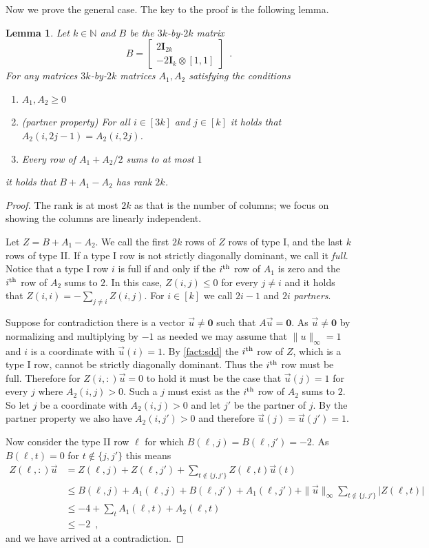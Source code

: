 \documentclass[10pt,a4paper]{article}
\newcommand{\N}{\mathbb{N}}
\newcommand{\zero}{\mathbf{0}}
\newcommand{\Id}{\mathbf{I}}
\newcommand{\vecu}{\vec{u}}
\newcommand{\ith}{i^{\scriptsize \mbox{{\rm th}}}}
\newcommand{\1}{\mathbf{1}}
\newtheorem{lemma}[theorem]{Lemma}
\theoremstyle{definition}
\begin{document}
Now we prove the general case.  The key to the proof is the following lemma.
\begin{lemma}
\label{lem:2k}
Let $k \in \N$ and $B$ be the $3k$-by-$2k$ matrix
\[
B = \begin{bmatrix} 2 \Id_{2k} \\ -2 \Id_k \otimes [1,1] \end{bmatrix} \enspace .
\]
For any matrices $3k$-by-$2k$ matrices $A_1, A_2$ satisfying the conditions
\begin{enumerate}
\item $A_1, A_2 \ge 0$
\item (partner property) For all $i \in [3k]$ and $j \in [k]$ it holds that $A_2(i,2j-1) = A_2(i,2j)$.
\item Every row of $A_1 + A_2/2$ sums to at most $1$
\end{enumerate}
it holds that $B +A_1 - A_2$ has rank $2k$.
\end{lemma}

\begin{proof}
The rank is at most $2k$ as that is the number of columns;  we focus on showing the columns are
linearly independent.

Let $Z = B + A_1 -A_2$.  We call the first $2k$ rows of $Z$ rows of type I, and the last $k$ rows
of type II.  If a type I row is not strictly diagonally dominant, we call it \emph{full}.  Notice that
a type I row $i$ is full if and only if the $\ith$ row of $A_1$ is zero and the $\ith$ row of $A_2$ sums to $2$.  In this
case, $Z(i,j) \le 0$ for every $j \ne i$ and it holds that $Z(i,i) = -\sum_{j \ne i} Z(i,j)$.
%
For $i \in [k]$ we call $2i-1$ and $2i$ \emph{partners}.

Suppose for contradiction there is a vector $\vecu \ne \zero$ such that $A\vecu = \zero$.  As $\vecu \ne \zero$ by
normalizing and multiplying by $-1$ as needed we may assume that $\|u\|_\infty = 1$ and $i$ is a coordinate with $\vecu(i)=1$.
By \cref{fact:sdd} the $\ith$ row of $Z$, which is a type I row, cannot be strictly diagonally dominant.  Thus the $\ith$ row
must be full.  Therefore for $Z(i,:) \vecu = 0$ to hold it must be the case that $\vecu(j) = 1$ for every $j$ where $A_2(i,j) > 0$.
Such a $j$ must exist as the $\ith$ row of $A_2$ sums to $2$.  So let $j$ be a coordinate with $A_2(i,j) > 0$ and let $j'$ be
the partner of $j$.  By the partner property we also have $A_2(i,j') > 0$ and therefore $\vecu(j) = \vecu(j') = 1$.

Now consider the type II row $\ell$ for which $B(\ell,j) = B(\ell,j') = -2$.
As $B(\ell,t) = 0$ for $t \not \in \{j,j'\}$ this means
\begin{align*}
Z(\ell,:) \vecu &= Z(\ell,j) + Z(\ell, j') + \sum_{t \not \in \{j,j'\}} Z(\ell,t) \vecu(t) \\
& \le B(\ell,j)+A_1(\ell,j) + B(\ell,j') + A_1(\ell,j') + \|\vecu\|_\infty \sum_{t \not \in \{j,j'\}} |Z(\ell,t)| \\
&\le -4 + \sum_{t} A_1(\ell,t) + A_2(\ell,t) \\
&\le -2 \enspace,
\end{align*}
and we have arrived at a contradiction.
 \end{proof}
\end{document}
